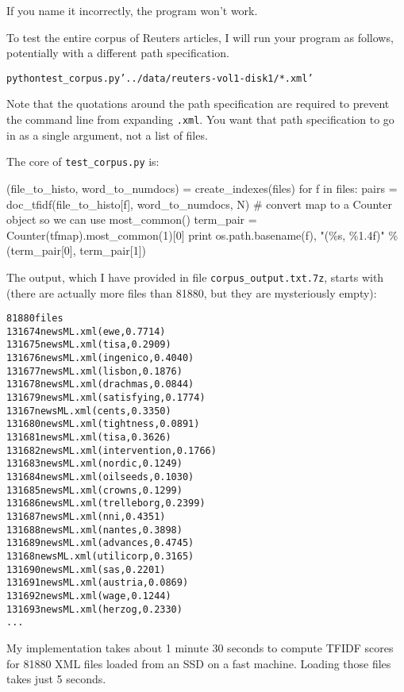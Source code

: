 \begin{fullwidth}
If you name it incorrectly, the program won't work. 

To test the entire corpus of Reuters articles, I will run your program as follows, potentially with a different path specification.
 
\begin{alltt}
python test_corpus.py '../data/reuters-vol1-disk1/*.xml'
\end{alltt}

\noindent Note that the quotations around the path specification are required to prevent the command line from expanding {\tt *.xml}. You want that path specification to go in as a single argument, not a list of files.

The core of {\tt test\_corpus.py} is:

\begin{pyverbatim}
(file_to_histo, word_to_numdocs) = create_indexes(files)
for f in files:
    pairs = doc_tfidf(file_to_histo[f], word_to_numdocs, N)
    # convert map to a Counter object so we can use most_common()
    term_pair = Counter(tfmap).most_common(1)[0]
    print os.path.basename(f), "(\%s, \%1.4f)" \% (term_pair[0], term_pair[1])
\end{pyverbatim}

\noindent The output, which I have provided in file {\tt corpus\_output.txt.7z}, starts with (there are actually more files than 81880, but they are mysteriously empty):

\begin{alltt}
81880 files
131674newsML.xml (ewe, 0.7714)
131675newsML.xml (tisa, 0.2909)
131676newsML.xml (ingenico, 0.4040)
131677newsML.xml (lisbon, 0.1876)
131678newsML.xml (drachmas, 0.0844)
131679newsML.xml (satisfying, 0.1774)
13167newsML.xml (cents, 0.3350)
131680newsML.xml (tightness, 0.0891)
131681newsML.xml (tisa, 0.3626)
131682newsML.xml (intervention, 0.1766)
131683newsML.xml (nordic, 0.1249)
131684newsML.xml (oilseeds, 0.1030)
131685newsML.xml (crowns, 0.1299)
131686newsML.xml (trelleborg, 0.2399)
131687newsML.xml (nni, 0.4351)
131688newsML.xml (nantes, 0.3898)
131689newsML.xml (advances, 0.4745)
13168newsML.xml (utilicorp, 0.3165)
131690newsML.xml (sas, 0.2201)
131691newsML.xml (austria, 0.0869)
131692newsML.xml (wage, 0.1244)
131693newsML.xml (herzog, 0.2330)
...
\end{alltt}

My implementation takes about 1 minute 30 seconds to compute TFIDF scores for 81880 XML files loaded from an SSD on a fast machine.  Loading those files takes just 5 seconds.
 

\end{fullwidth}
